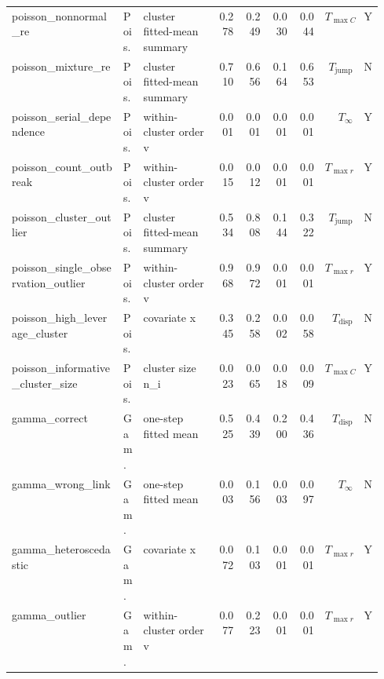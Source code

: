 \begin{longtable}{p{0.30\linewidth}p{0.05\linewidth}p{0.20\linewidth}rrrrrl}
poisson\_nonnormal\_re & Pois. & cluster fitted-mean summary & 0.278 & 0.249 & 0.030 & 0.044 & $T_{\max C}$ & Y \\
poisson\_mixture\_re & Pois. & cluster fitted-mean summary & 0.710 & 0.656 & 0.164 & 0.653 & $T_{\mathrm{jump}}$ & N \\
poisson\_serial\_dependence & Pois. & within-cluster order v & 0.001 & 0.001 & 0.001 & 0.001 & $T_\infty$ & Y \\
poisson\_count\_outbreak & Pois. & within-cluster order v & 0.015 & 0.012 & 0.001 & 0.001 & $T_{\max r}$ & Y \\
poisson\_cluster\_outlier & Pois. & cluster fitted-mean summary & 0.534 & 0.808 & 0.144 & 0.322 & $T_{\mathrm{jump}}$ & N \\
poisson\_single\_observation\_outlier & Pois. & within-cluster order v & 0.968 & 0.972 & 0.001 & 0.001 & $T_{\max r}$ & Y \\
poisson\_high\_leverage\_cluster & Pois. & covariate x & 0.345 & 0.258 & 0.002 & 0.058 & $T_{\mathrm{disp}}$ & N \\
poisson\_informative\_cluster\_size & Pois. & cluster size n\_i & 0.023 & 0.065 & 0.018 & 0.009 & $T_{\max C}$ & Y \\
gamma\_correct & Gam. & one-step fitted mean & 0.525 & 0.439 & 0.200 & 0.436 & $T_{\mathrm{disp}}$ & N \\
gamma\_wrong\_link & Gam. & one-step fitted mean & 0.003 & 0.156 & 0.003 & 0.097 & $T_\infty$ & N \\
gamma\_heteroscedastic & Gam. & covariate x & 0.072 & 0.103 & 0.001 & 0.001 & $T_{\max r}$ & Y \\
gamma\_outlier & Gam. & within-cluster order v & 0.077 & 0.223 & 0.001 & 0.001 & $T_{\max r}$ & Y \\
\end{longtable}
\endgroup
